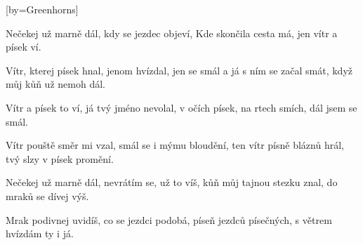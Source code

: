 [by={Greenhorns}]

\beginverse{}
Nečekej už marně dál,
kdy se jezdec objeví,
Kde skončila cesta má,
jen vítr a písek ví.
\endverse{}

\beginverse{}
Vítr, kterej písek hnal,
jenom hvízdal, jen se smál
a já s ním se začal smát,
když můj kůň už nemoh dál.
\endverse{}

\beginchorus{}
Vítr a písek to ví,
já tvý jméno nevolal,
v očích písek, na rtech smích,
dál jsem se smál.
\endchorus{}

\beginverse{}
Vítr pouště směr mi vzal,
smál se i mýmu bloudění,
ten vítr písně bláznů hrál,
tvý slzy v písek promění.
\endverse{}

\beginchorus{}

\endchorus{}

\beginverse{}
Nečekej už marně dál,
nevrátím se, už to víš,
kůň můj tajnou stezku znal,
do mraků se dívej výš.
\endverse{}

\beginverse{}
Mrak podivnej uvidíš,
co se jezdci podobá,
píseň jezdců písečných,
s větrem hvízdám ty i já.
\endverse{}

\endsong{}
